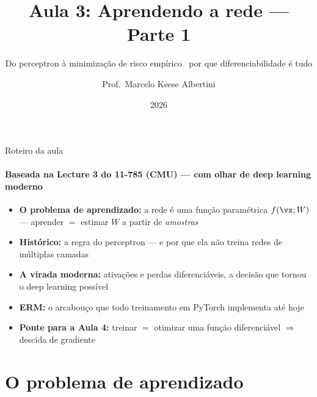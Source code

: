\documentclass[aspectratio=169, 11pt]{beamer}
\title[Aula 3 — Aprendendo a rede I]{Aula 3: Aprendendo a rede — Parte 1}
\subtitle[GBC073 — Inteligência Computacional]{Do perceptron à minimização de risco empírico \textbullet\ por que diferenciabilidade é tudo}
\author[Prof.\ Marcelo Albertini]{Prof.\ Marcelo Keese Albertini}
\institute{GBC073 — Inteligência Computacional \textbullet\ Universidade Federal de Uberlândia}
\date{2026}
\begin{document}
\begin{frame}
  \titlepage
\end{frame}

\begin{frame}{Roteiro da aula}
  \framesubtitle{Baseada na Lecture 3 do 11-785 (CMU) — com olhar de deep learning moderno}
  \begin{itemize}\setlength{\itemsep}{0.5ex}
    \item<1-> \textbf{O problema de aprendizado:} a rede é uma função paramétrica
          $f(\vx; W)$ — aprender $=$ estimar $W$ a partir de \emph{amostras}
    \item<2-> \textbf{Histórico:} a regra do perceptron — e por que ela
          \alert{não} treina redes de múltiplas camadas
    \item<3-> \textbf{A virada moderna:} ativações e perdas \alert{diferenciáveis},
          a decisão que tornou o deep learning possível
    \item<4-> \textbf{ERM:} o arcabouço que todo treinamento em PyTorch
          implementa até hoje
    \item<5-> \textbf{Ponte para a Aula 4:} treinar $=$ otimizar uma função
          diferenciável $\Rightarrow$ descida de gradiente
  \end{itemize}

\end{frame}

\section{O problema de aprendizado}
\end{document}
